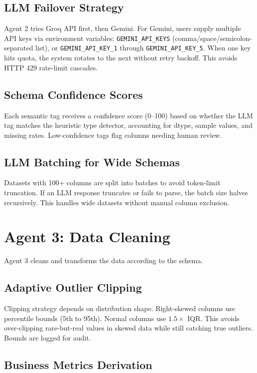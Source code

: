 \subsection{LLM Failover Strategy}

Agent 2 tries Groq API first, then Gemini. For Gemini, users supply multiple API keys via environment variables: \texttt{GEMINI\_API\_KEYS} (comma/space/semicolon-separated list), or \texttt{GEMINI\_API\_KEY\_1} through \texttt{GEMINI\_API\_KEY\_5}. When one key hits quota, the system rotates to the next without retry backoff. This avoids HTTP 429 rate-limit cascades.

\subsection{Schema Confidence Scores}

Each semantic tag receives a confidence score (0--100) based on whether the LLM tag matches the heuristic type detector, accounting for dtype, sample values, and missing rates. Low-confidence tags flag columns needing human review.

\subsection{LLM Batching for Wide Schemas}

Datasets with 100+ columns are split into batches to avoid token-limit truncation. If an LLM response truncates or fails to parse, the batch size halves recursively. This handles wide datasets without manual column exclusion.

\section{Agent 3: Data Cleaning}

Agent 3 cleans and transforms the data according to the schema.

\subsection{Adaptive Outlier Clipping}

Clipping strategy depends on distribution shape. Right-skewed columns use percentile bounds (5th to 95th). Normal columns use $1.5\times$ IQR. This avoids over-clipping rare-but-real values in skewed data while still catching true outliers. Bounds are logged for audit.

\subsection{Business Metrics Derivation}

